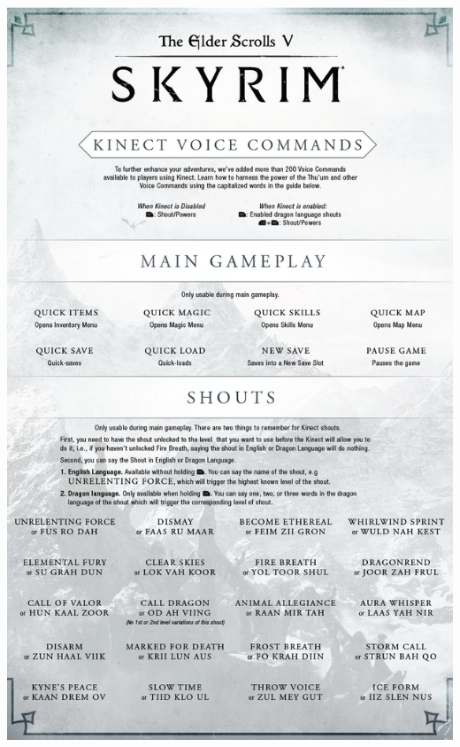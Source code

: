 \documentclass[11pt]{article}
\begin{document}
\begin{appendices}
\includegraphics[scale=0.235]{skyrim-1.jpg}

\end{appendices}
\end{document}
